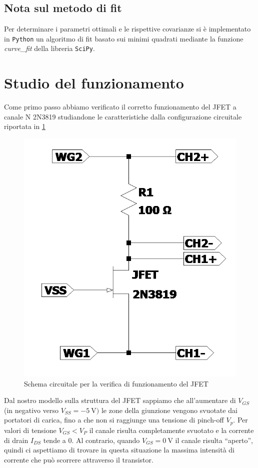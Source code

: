 \documentclass[10pt, a4paper, italian]{article}
\begin{document}
\subsection*{Nota sul metodo di fit}
Per determinare i parametri ottimali e le rispettive covarianze si \`e
implementato in \verb+Python+ un algoritmo di fit basato sui minimi quadrati
mediante la funzione \emph{curve\_fit} della libreria \texttt{SciPy}.

\section{Studio del funzionamento}
Come primo passo abbiamo verificato il corretto funzionamento del JFET a canale
N 2N3819 studiandone le caratteristiche dalla configurazione circuitale
riportata in \ref{schm: tracer}
\begin{figure}[htbp]
    \centering
	\includegraphics[scale=0.5]{Draft1}
    \caption{Schema circuitale per la verifica di funzionamento del JFET
    \label{schm: tracer}}
\end{figure}

Dal nostro modello sulla struttura del JFET sappiamo che all'aumentare di
$V_{GS}$ (in negativo verso $V_{SS} = \SI{-5}{\V})$ le zone della giunzione
vengono svuotate dai portatori di carica, fino a che non si raggiunge una
tensione di pinch-off $V_p$. Per valori di tensione $V_{GS} < V_P$ il canale
risulta completamente svuotato e la corrente di drain $I_{DS}$ tende a 0.
Al contrario, quando $V_{GS} = \SI{0}{\V}$ il canale risulta ``aperto'', quindi
ci aspettiamo di trovare in questa situazione la massima intensità di corrente
che può scorrere attraverso il transistor.
\end{document}

